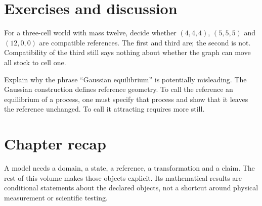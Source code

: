 \section*{Exercises and discussion}
For a three-cell world with mass twelve, decide whether $(4,4,4)$,
$(5,5,5)$ and $(12,0,0)$ are compatible references. The first and third are;
the second is not. Compatibility of the third still says nothing about
whether the graph can move all stock to cell one.

Explain why the phrase ``Gaussian equilibrium'' is potentially misleading.
The Gaussian construction defines reference geometry. To call the reference
an equilibrium of a process, one must specify that process and show that it
leaves the reference unchanged. To call it attracting requires more still.

\section*{Chapter recap}
A model needs a domain, a state, a reference, a transformation and a claim.
The rest of this volume makes those objects explicit. Its mathematical
results are conditional statements about the declared objects, not a
shortcut around physical measurement or scientific testing.

